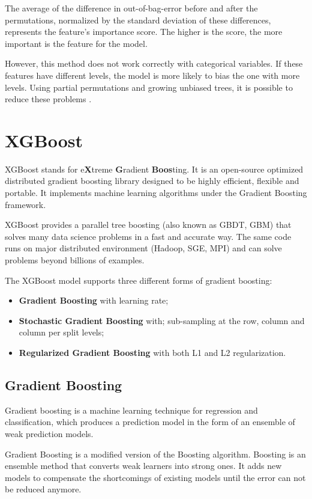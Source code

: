 The average of the difference in out-of-bag-error before and after the permutations, normalized by the standard deviation of these differences, represents the feature's importance score.
The higher is the score, the more important is the feature for the model.

However, this method does not work correctly with categorical variables. If these features have different levels, the model is more likely to bias the one with more levels. Using partial permutations and growing unbiased trees, it is possible to reduce these problems \cite{deng2011bias}.

\section{XGBoost}
XGBoost stands for e\textbf{X}treme \textbf{G}radient \textbf{Boos}ting. It is an open-source optimized distributed gradient boosting library designed to be highly efficient, flexible and portable. It implements machine learning algorithms under the Gradient Boosting framework. 

XGBoost provides a parallel tree boosting (also known as GBDT, GBM) that solves many data science problems in a fast and accurate way. The same code runs on major distributed environment (Hadoop, SGE, MPI) and can solve problems beyond billions of examples. \cite{xgboost}

The XGBoost model supports three different forms of gradient boosting: \cite{gentleXgboost}
\begin{itemize}
	\item \textbf{Gradient Boosting} with learning rate;
	\item \textbf{Stochastic Gradient Boosting} with; sub-sampling at the row, column and column per split levels;
	\item \textbf{Regularized Gradient Boosting} with both L1 and L2 regularization.
\end{itemize} 

\subsection{Gradient Boosting}

Gradient boosting is a machine learning technique for regression and classification, which produces a prediction model in the form of an ensemble of weak prediction models. 

Gradient Boosting is a modified version of the Boosting algorithm.
Boosting is an ensemble method that converts weak learners into strong ones. It adds new models to compensate the shortcomings of existing models until the error can not be reduced anymore. \cite{zhou2012ensemble}

